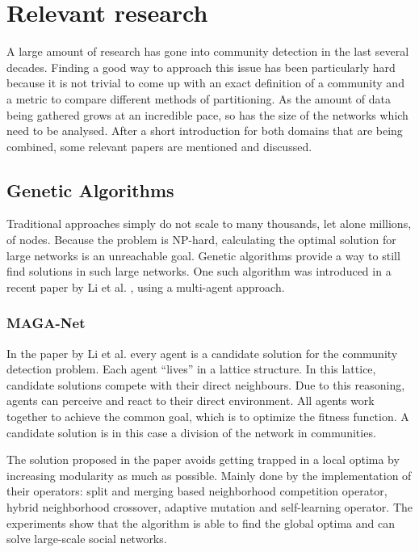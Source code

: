\section{Relevant research}
\label{chapter:relevantResearch}
A large amount of research has gone into community detection in the last several decades. 
Finding a good way to approach this issue has been particularly hard because it is not trivial to come up with an exact definition of a community and a metric to compare different methods of partitioning. 
As the amount of data being gathered grows at an incredible pace, so has the size of the networks which need to be analysed. 
After a short introduction for both domains that are being combined, some relevant papers are mentioned and discussed. \\

\subsection{Genetic Algorithms}
Traditional approaches simply do not scale to many thousands, let alone millions, of nodes. 
Because the problem is NP-hard, calculating the optimal solution for large networks is an unreachable goal.
Genetic algorithms provide a way to still find solutions in such large networks. 
One such algorithm was introduced in a recent paper by Li et al. \cite{multiagent2016}, using a multi-agent approach. 


\subsubsection{MAGA-Net}
In the paper by Li et al. \cite{multiagent2016} every agent is a candidate solution for the community detection problem.
Each agent ``lives'' in a lattice structure. 
In this lattice, candidate solutions compete with their direct neighbours.
Due to this reasoning, agents can perceive and react to their direct environment.
All agents work together to achieve the common goal, which is to optimize the fitness function.
A candidate solution is in this case a division of the network in communities.

The solution proposed in the paper avoids getting trapped in a local optima by increasing modularity as much as possible.
Mainly done by the implementation of their operators: split and merging based neighborhood competition operator, hybrid neighborhood crossover, adaptive mutation and self-learning operator.
The experiments show that the algorithm is able to find the global optima and can solve large-scale social networks.

